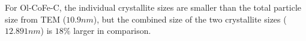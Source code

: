 \documentclass[\main/dresen_thesis.tex]{subfiles}
\begin{document}
    For Ol-CoFe-C, the individual crystallite sizes are smaller than the total particle size from TEM ($10.9 \unit{nm}$), but the combined size of the two crystallite sizes ($12.891 \unit{nm}$) is $18 \%$ larger in comparison.

\end{document}
